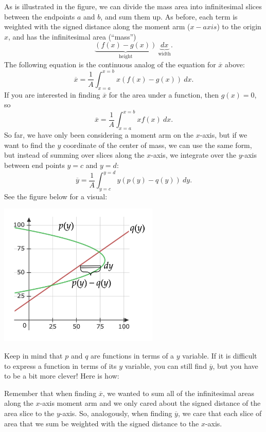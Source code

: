 As is illustrated in the figure, we can divide the mass area into infinitesimal slices between the endpoints $a$ and $b$, and sum them up. As before, each term is weighted with the signed distance along the moment arm ($x-axis$) to the origin $x$, and has the infinitesimal area (``mass'')
$$\underbrace{(f(x)-g(x))}_\text{height}\ \underbrace{dx}_\text{width}.$$
The following equation is the continuous analog of the equation for $\overline{x}$ above:
$$
\overline{x} = \frac{1}{A}\int_{x=a}^{x=b}x(f(x)-g(x))\ dx.
$$
If you are interested in finding $\overline{x}$ for the area under a function, then $g(x)=0$, so
$$
\overline{x} = \frac{1}{A}\int_{x=a}^{x=b}xf(x)\ dx.
$$
So far, we have only been considering a moment arm on the $x$-axis, but if we want to find the $y$ coordinate of the center of mass, we can use the same form, but instead of summing over slices along the $x$-axis, we integrate over the $y$-axis between end points $y=c$ and $y=d$:
$$
\overline{y} = \frac{1}{A}\int_{y=c}^{y=d}y(p(y)-q(y))\ dy.
$$
See the figure below for a visual:


\begin{center}
\includegraphics[width=3in]{img/moments_plot2.png}
\end{center}


Keep in mind that $p$ and $q$ are functions in terms of a $y$ variable. If it is difficult to express a function in terms of its $y$ variable, you can still find $\overline{y}$, but you have to be a bit more clever! Here is how:

Remember that when finding $\overline{x}$, we wanted to sum all of the infinitesimal areas along the $x$-axis moment arm and we only cared about the signed distance of the area slice to the $y$-axis. So, analogously, when finding $\overline{y}$, we care that each slice of area that we sum be weighted with the signed distance to the $x$-axis.


